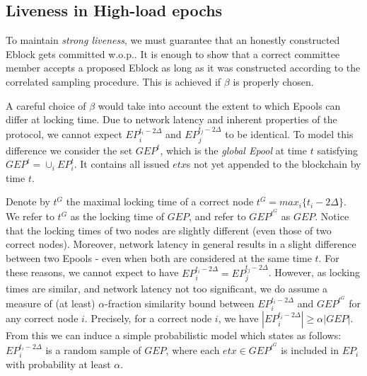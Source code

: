 \subsection{Liveness in High-load epochs} \label{Liveness}
To maintain \emph{strong liveness}, we must guarantee that an honestly constructed Eblock gets committed w.o.p.. It is enough to show that a correct committee member accepts a proposed Eblock as long as it was constructed according to the correlated sampling procedure. This is achieved if $\beta$ is properly chosen.

A careful choice of $\beta$ would take into account the extent to which Epools can differ at locking time. Due to network latency and inherent properties of the protocol, we cannot expect $EP_i^{t_i-2\Delta}$ and $EP_j^{t_j-2\Delta}$ to be identical. To model this difference we consider the set $GEP^t$, which is the \emph{global Epool} at time $t$ satisfying $GEP^t = \cup_{i}EP_i^t$. It contains all issued $etx$s not yet appended to the blockchain by time $t$. 


Denote by $t^G$ the maximal locking time of a correct node $t^G = max_i\{t_i-2\Delta\}$. We refer to $t^G$ as the locking time of $GEP$, and refer to $GEP^{t^G}$ as $GEP$. Notice that the locking times of two nodes are slightly different (even those of two correct nodes). Moreover, network latency in general results in a slight difference between two Epools - even when both are considered at the same time $t$. For these reasons, we cannot expect to have $EP_i^{t_i-2\Delta}=EP_j^{t_j-2\Delta}$. However, as locking times are similar, and network latency not too significant, we do assume a measure of (at least) $\alpha$-fraction similarity bound between $EP_i^{t_i-2\Delta}$ and $GEP^{t^G}$ for any correct node $i$. Precisely, for a correct node $i$, we have $|EP_i^{t_i-2\Delta}| \geq \alpha|GEP|$.
From this we can induce a simple probabilistic model which states as follows: $EP_i^{t_i-2\Delta}$ is a random sample of $GEP$, where each $etx\in GEP^{t^G}$ is included in $EP_i$ with probability at least $\alpha$.

